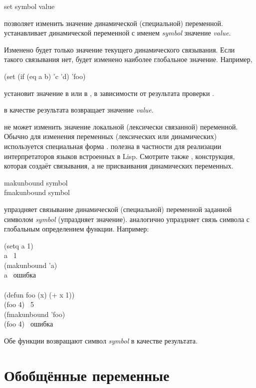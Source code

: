 \begin{defun}[Function]
set symbol value

 позволяет изменить значение динамической (специальной) переменной.
 устанавливает динамической переменной с именем \emph{symbol} значение
\emph{value}.

Изменено будет только значение текущего динамического связывания. Если такого
связывания нет, будет изменено наиболее глобальное значение.
Например,
\begin{lisp}
(set (if (eq a b) 'c 'd) 'foo)
\end{lisp}
установит значение  в  или  в , в зависимости от
результата проверки .

 в качестве результата возвращает значение \emph{value}.

 не может изменить значение локальной (лексически связанной)
переменной.
Обычно для изменения переменных (лексических или динамических) используется
специальная форма .
 полезна в частности для реализации интерпретаторов языков встроенных в
Lisp.
Смотрите также , конструкция, которая создаёт связывания, а не
присваивания динамических переменных.
\end{defun}

\begin{defun}[Function]
makunbound symbol \\
fmakunbound symbol

 упраздняет связывание динамической (специальной) переменной
заданной символом \emph{symbol} (упраздняет значение). 
аналогично упраздняет связь символа с глобальным определением функции.
Например:
\begin{lisp}
(setq a 1) \\
a \EV\ 1 \\
(makunbound 'a) \\
a \EV\ \textrm{ошибка} \\
\\
(defun foo (x) (+ x 1)) \\
(foo 4) \EV\ 5 \\
(fmakunbound 'foo) \\
(foo 4) \EV\ \textrm{ошибка}
\end{lisp}
Обе функции возвращают символ \emph{symbol} в качестве результата.
\end{defun}

\section{Обобщённые переменные}
\label{SETF-SECTION}

